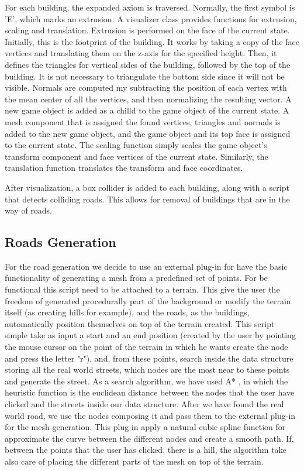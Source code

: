 \documentclass[conference]{IEEEtran}
\begin{document}
For each building, the expanded axiom is traversed. Normally, the first symbol is 'E', which marks an extrusion. A visualizer class provides functions for extrusion, scaling and translation. Extrusion is performed on the face of the current state. Initially, this is the footprint of the building. It works by taking a copy of the face vertices and translating them on the z-axis for the specified height. Then, it defines the triangles for vertical sides of the building, followed by the top of the building. It is not necessary to triangulate the bottom side since it will not be visible. Normals are computed my subtracting the position of each vertex with the mean center of all the vertices, and then normalizing the resulting vector. A new game object is added as a chilld to the game object of the current state. A mesh component that is assigned the found vertices, triangles and normals is added to the new game object, and the game object and its top face is assigned to the current state. The scaling function simply scales the game object's transform component and face vertices of the current state. Similarly, the translation function translates the transform and face coordinates.\newline

After visualization, a box collider is added to each building, along with a script that detects colliding roads. This allows for removal of buildings that are in the way of roads.

\subsection{Roads Generation}

For the road generation we decide to use an external plug-in \cite{plugin} for have the basic functionality of generating a mesh from a predefined set of points. For be functional this script need to be attached to a terrain. This give the user the freedom of generated procedurally part of the background or modify the terrain itself (as creating hills for example), and the roads, as the buildings, automatically position themselves on top of the terrain created. This script simple take as input a start and an end position (created by the user by pointing the mouse cursor on the point of the terrain in which he wants create the node and press the letter "r"), and, from these points, search inside the data structure storing all the real world streets, which nodes are the most near to these points and generate the street. As a search algorithm, we have used A* , in which the heuristic function is the euclidean distance between the nodes that the user have clicked and the streets inside our data structure. After we have found the real world road, we use the nodes composing it and pass them to the external plug-in for the mesh generation. This plug-in apply a natural cubic spline \cite{spline} function for approximate the curve between the different nodes and create a smooth path.
If, between the points that the user has clicked, there is a hill, the algorithm take also care of placing the different parts of the mesh on top of the terrain.
\end{document}
